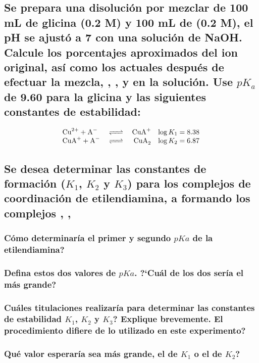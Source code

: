 \documentclass[fleqn,10pt]{SelfArx} %
\begin{document}
	\subsection[Se prepara]{Se prepara una disoluci\'on por mezclar de 100 mL de glicina (0.2 M) y 100 mL de  (0.2 M), el pH se ajust\'o a 7 con una soluci\'on de NaOH. Calcule los porcentajes aproximados del ion  original, as\'i como los actuales despu\'es de efectuar la mezcla, , , y  en la soluci\'on. Use $pK_a$ de 9.60 para la glicina y las siguientes constantes de estabilidad:}
	\begin{equation*}
	    \begin{array}{lcrc}
	        \ce{Cu^{2+} + A-} & \ce{<=>} & \ce{CuA+} & \log K_1 = 8.38\\
	        \ce{CuA+ + A-} & \ce{<=>} & \ce{CuA_2} & \log K_2 = 6.87 
	    \end{array}
	\end{equation*}
	
	\subsection{Se desea determinar las constantes de formaci\'on ($K_1$, $K_2$ y $K_3$) para los complejos de coordinaci\'on de etilendiamina, a  formando los complejos , , }
	\subsubsection{C\'omo determinar\'ia el primer y segundo $pKa$ de la etilendiamina?}
	\subsubsection{Defina estos dos valores de $pKa$. ?`Cu\'al de los dos ser\'ia el m\'as grande?}
	\subsubsection{Cu\'ales titulaciones realizar\'ia para determinar las constantes de estabilidad $K_1$, $K_2$ y $K_3$? Explique brevemente. El procedimiento difiere de lo utilizado en este experimento?}
	\subsubsection{Qu\'e valor esperar\'ia sea m\'as grande, el de $K_1$ o el de $K_2$?}
	
\end{document}

